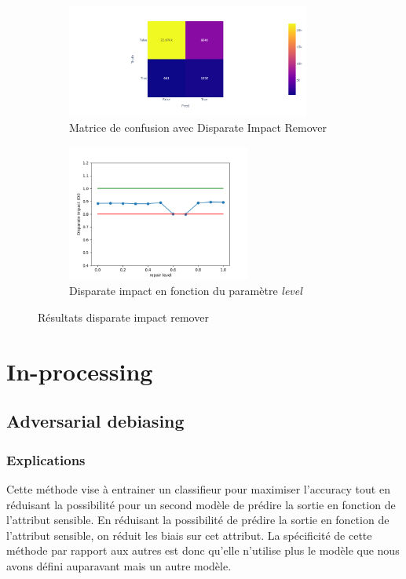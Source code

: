 \documentclass{article}
\begin{document}
    \begin{figure}[!h]
        \centering
        \begin{subfigure}{8cm}
            \includegraphics[width=8cm]{./img/DIR_confusion_matrix.png}
            \caption{Matrice de confusion avec Disparate Impact Remover}\label{fig:DIR_matrix}
        \end{subfigure}
        \hspace{0.2cm}
        \begin{subfigure}{6cm}
            \includegraphics[width=6cm]{./img/disparate_impact_remover.png}
        \caption{Disparate impact en fonction du paramètre \textit{level}}\label{fig:DIR_param}
        \end{subfigure}
        \caption{Résultats disparate impact remover}\label{fig:DIR}
    \end{figure}
    

    \section{In-processing}

    \subsection{Adversarial debiasing}
    \subsubsection{Explications}
    Cette méthode vise à entrainer un classifieur pour maximiser l'accuracy tout en réduisant la possibilité pour un second 
    modèle de prédire la sortie en fonction de l'attribut sensible. En réduisant la possibilité de prédire la sortie en 
    fonction de l'attribut sensible, on réduit les biais sur cet attribut.
    La spécificité de cette méthode par rapport aux autres est donc qu'elle n'utilise plus le modèle que nous avons 
    défini auparavant mais un autre modèle.
\end{document}

